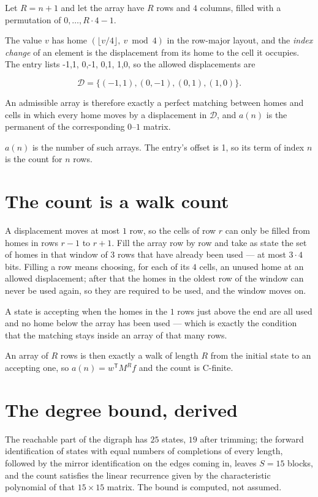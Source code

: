 \documentclass[11pt]{article}
\theoremstyle{definition}
\begin{document}
Let $R = n + 1$ and let the array have $R$ rows and $4$ columns, filled with a permutation of $0,\dots,R\cdot4-1$.

The value $v$ has home $(\lfloor v/4\rfloor,\ v \bmod 4)$ in the row-major layout, and the {\itshape index change} of an element is the displacement from its home to the cell it occupies. The entry lists -1,1, 0,-1, 0,1, 1,0, so the allowed displacements are

\[\mathcal{D} = \{(-1,1), (0,-1), (0,1), (1,0)\}.\]

An admissible array is therefore exactly a perfect matching between homes and cells in which every home moves by a displacement in $\mathcal{D}$, and $a(n)$ is the permanent of the corresponding $0$--$1$ matrix.

$a(n)$ is the number of such arrays. The entry's offset is 1, so its term of index $n$ is the count for $n$ rows.

\section{The count is a walk count}

A displacement moves at most $1$ row, so the cells of row $r$ can only be filled from homes in rows $r-1$ to $r+1$. Fill the array row by row and take as state the set of homes in that window of $3$ rows that have already been used --- at most $3\cdot4$ bits. Filling a row means choosing, for each of its $4$ cells, an unused home at an allowed displacement; after that the homes in the oldest row of the window can never be used again, so they are required to be used, and the window moves on.

A state is accepting when the homes in the $1$ rows just above the end are all used and no home below the array has been used --- which is exactly the condition that the matching stays inside an array of that many rows.

An array of $R$ rows is then exactly a walk of length $R$ from the initial state to an accepting one, so $a(n) = w^{\mathsf T}M^{R}f$ and the count is C-finite.

\section{The degree bound, derived}

The reachable part of the digraph has $25$ states, $19$ after trimming; the forward identification of states with equal numbers of completions of every length, followed by the mirror identification on the edges coming in, leaves $S = 15$ blocks, and the count satisfies the linear recurrence given by the characteristic polynomial of that $15\times15$ matrix. The bound is computed, not assumed.
\end{document}
